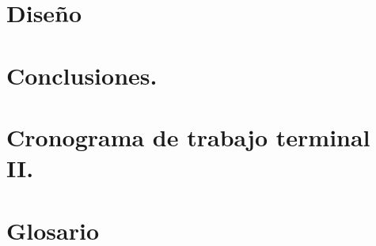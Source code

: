 \documentclass[10pt]{article}
\begin{document}
\section{Diseño}

\section{Conclusiones.}

\section{Cronograma de trabajo terminal II.}

\newpage

\section{Glosario}
\end{document}
